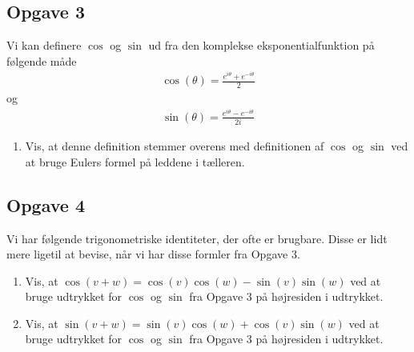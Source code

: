 \documentclass[12pt]{article}
\begin{document}
\subsection*{Opgave 3}
Vi kan definere $\cos$ og $\sin$ ud fra den komplekse eksponentialfunktion på følgende måde
\begin{align*}
	\cos(\theta) = \frac{e^{i\theta}+e^{-i\theta}}{2}
\end{align*}
og
\begin{align*}
	\sin(\theta) = \frac{e^{i\theta}-e^{-i\theta}}{2i}
\end{align*}
\begin{enumerate}[label=\roman*)]
	\item Vis, at denne definition stemmer overens med definitionen af $\cos$ og $\sin$ ved at bruge Eulers formel på 
	leddene i tælleren. 
\end{enumerate}
\subsection*{Opgave 4}
Vi har følgende trigonometriske identiteter, der ofte er brugbare. Disse er lidt mere ligetil at bevise, når vi har disse formler fra Opgave 3.
\begin{enumerate}[label=\roman*)]
	\item Vis, at $\cos(v + w) = \cos(v)\cos(w) - \sin(v)\sin(w)$ ved at bruge udtrykket for $\cos$ og $\sin$ fra
	 Opgave 3 på højresiden i udtrykket.
	\item Vis, at $\sin(v + w) = \sin(v)\cos(w) + \cos(v)\sin(w)$ ved at bruge udtrykket for $\cos$ og $\sin$ fra 
	Opgave 3 på højresiden i udtrykket. 
	
\end{enumerate}

\newpage

\begin{center}
\end{center}
\end{document}
